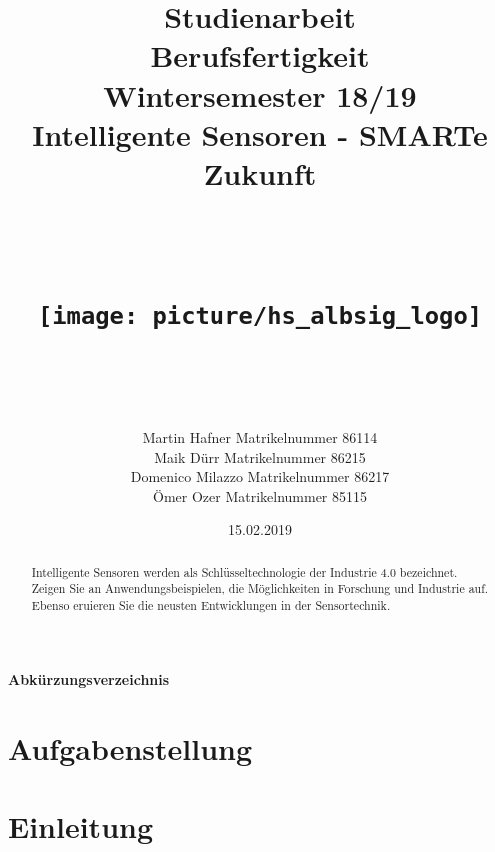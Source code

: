 \documentclass[a4paper,10pt]{scrartcl}
\begin{document}
\title{Studienarbeit \vspace{50px} \hfill \\ Berufsfertigkeit\\ Wintersemester 18/19 \vspace{20px} \hfill \\  \vspace{50px} 
Intelligente Sensoren - SMARTe Zukunft \hfill \\ \hfill \\
\hfill \\ 
\begin{center}
\texttt{[image: picture/hs\_albsig\_logo]}
\end{center}
\hfill \\  \vspace{50px}
}


\author{Martin Hafner Matrikelnummer 86114 \hfill \\
Maik Dürr Matrikelnummer 86215 \hfill \\
Domenico Milazzo Matrikelnummer 86217 \hfill \\
Ömer Ozer Matrikelnummer 85115 \hfill \\}
\date{15.02.2019}
\maketitle
\thispagestyle{empty}
\clearpage
\tableofcontents
\listoffigures
\listoftables
\paragraph{\Large{Abkürzungsverzeichnis}}
\begin{acronym}[Bash]
\end{acronym}
\onehalfspacing

\section{Aufgabenstellung}
\begin{abstract}
Intelligente Sensoren werden als Schlüsseltechnologie der Industrie 4.0 bezeichnet. Zeigen Sie an Anwendungsbeispielen, die Möglichkeiten in Forschung und Industrie auf. Ebenso eruieren Sie die neusten Entwicklungen in der Sensortechnik.
\end{abstract}


\section{Einleitung}

\setcounter{page}{1}

\newpage



\clearpage

\end{document}
